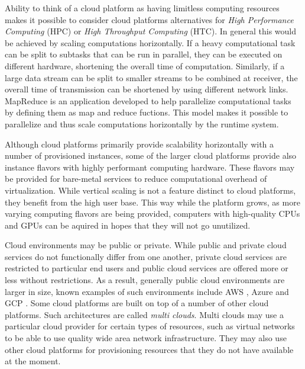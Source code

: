 Ability to think of a cloud platform as having limitless computing resources
makes it possible to consider cloud platforms alternatives for \textit{High
Performance Computing} (HPC) or \textit{High Throughput Computing} (HTC). In
general this would be achieved by scaling computations horizontally. If a heavy
computational task can be split to subtasks that can be run in parallel, they
can be executed on different hardware, shortening the overall time of
computation. Similarly, if a large data stream can be split to smaller streams
to be combined at receiver, the overall time of transmission can be shortened
by using different network links. MapReduce \cite{mapreduce} is an application
developed to help parallelize computational tasks by defining them as map and
reduce fuctions. This model makes it possible to parallelize and thus scale
computations horizontally by the runtime system.

Although cloud platforms primarily provide scalability horizontally with a
number of provisioned instances, some of the larger cloud platforms provide
also instance flavors with highly performant computing hardware. These flavors
may be provided for bare-metal services to reduce computational overhead of
virtualization. While vertical scaling is not a feature distinct to cloud
platforms, they benefit from the high user base. This way while the platform
grows, as more varying computing flavors are being provided, computers with
high-quality CPUs and GPUs can be aquired in hopes that they will not go
unutilized.

Cloud environments may be public or private. While public and private cloud
services do not functionally differ from one another, private cloud services
are restricted to particular end users and public cloud services are offered
more or less without restrictions. As a result, generally public cloud
environments are larger in size, known examples of such environments include
AWS \cite{aws}, Azure \cite{azure} and GCP \cite{gcp}. Some cloud platforms are
built on top of a number of other cloud platforms. Such architectures are
called \textit{multi clouds}. Multi clouds may use a particular cloud provider
for certain types of resources, such as virtual networks to be able to use
quality wide area network infrastructure. They may also use other cloud
platforms for provisioning resources that they do not have available at the
moment.

